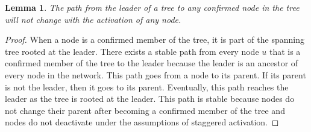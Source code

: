 \documentclass[english]{article}
\newtheorem{lemma}[theorem]{Lemma}
\begin{document}
\begin{lemma}
\label{StaggeredStablePath}
The path from the leader of a tree to any confirmed node in the tree will not change with the activation of any node.
\end{lemma}
\begin{proof}
When a node is a confirmed member of the tree, it is part of the spanning tree rooted at the leader. There exists a stable path from every node $u$ that is a confirmed member of the tree to the leader because the leader is an ancestor of every node in the network. This path goes from a node to its parent. If its parent is not the leader, then it goes to its parent. Eventually, this path reaches the leader as the tree is rooted at the leader. This path is stable because nodes do not change their parent after becoming a confirmed member of the tree and nodes do not deactivate under the assumptions of staggered activation.
\end{proof}
\end{document}
